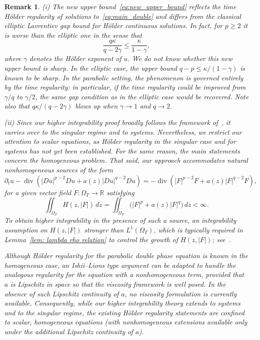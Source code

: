\documentclass[10pt,a4paper]{amsart}
\newtheorem{remark}[theorem]{Remark}
\numberwithin{equation}{section}
\newcommand{\RR}{\mathds{R}}
\begin{document}
\begin{remark}\label{rem:comments}
\textup{(i)} The new upper bound~\eqref{eq:new_upper_bound} reflects the time
H\"older regularity of solutions to~\eqref{eq:main_double} and differs from the
classical elliptic Lavrentiev gap bound for H\"older continuous solutions. In
fact, for $p \ge 2$ it is worse than the elliptic one in the sense that
\[
  \frac{q\kappa}{q - 2\gamma} \le \frac{\kappa}{1 - \gamma},
\]
where $\gamma$ denotes the H\"older exponent of $u$. We do not know whether
this new upper bound is sharp. In the elliptic case, the upper bound
$q-p \le \kappa/(1 - \gamma)$ is known to be sharp. In the parabolic setting,
the phenomenon is governed entirely by the time regularity: in particular, if
the time regularity could be improved from $\gamma/q$ to $\gamma/2$, the same
gap condition as in the elliptic case would be recovered. Note also that
$q\kappa/(q - 2\gamma)$ blows up when $\gamma \to 1$ and $q\to 2$.

\textup{(ii)} Since our higher integrability proof broadly follows the
framework of~\cite{2023_Gradient_Higher_Integrability_for_Degenerate_Parabolic_Double-Phase_Systems, S25}, it carries over to the singular
regime and to systems. Nevertheless, we restrict our attention to scalar
equations, as H\"older regularity in the singular case and for systems has
not yet been established. For the same reason, the main statements concern
the homogeneous problem. That said, our approach accommodates natural
nonhomogeneous sources of the form
\begin{equation*}
  \partial_tu - \operatorname{div}\left(|Du|^{p-2}Du + a(z)|Du|^{q-2}Du\right)
  = -\operatorname{div}\left(|F|^{p-2}F + a(z)|F|^{q-2}F\right),
\end{equation*}
for a given vector field $F : \Omega_T \to \RR$ satisfying
\[
  \iint_{\Omega_T} H(z, |F|)\, dz
  = \iint_{\Omega_T} \bigl(|F|^p + a(z)|F|^q\bigr)\, dz < \infty.
\]
To obtain higher integrability in the presence of such a source, an integrability assumption on $H(z, |F|)$ stronger than $L^1(\Omega_T)$, which is typically required in Lemma~\ref{lem: lambda rho relation} to control the growth of $H(z, |F|)$; see~\cite{CGK2025}.

Although H\"older regularity for the parabolic double phase equation is known
in the homogeneous case, an Ishii--Lions type argument can be adapted to
handle the analogous regularity for the equation with a nonhomogeneous term,
provided that $a$ is Lipschitz in space so that the viscosity framework is well
posed. In the absence of such Lipschitz continuity of $a$, no viscosity
formulation is currently available. Consequently, while our higher
integrability theory extends to systems and to the singular regime, the
existing H\"older regularity statements are confined to scalar, homogeneous
equations (with nonhomogeneous extensions available only under the additional
Lipschitz continuity of $a$).


\end{remark}
\end{document}
